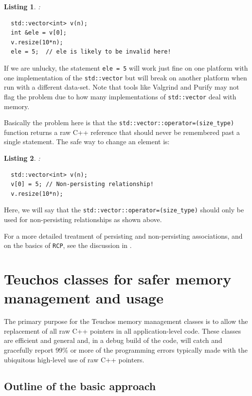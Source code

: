 \documentclass[pdf,ps2pdf,11pt]{SANDreport}
\newtheorem{listing}{Listing}
\begin{document}
\begin{listing}:\\
{\small\begin{verbatim}
  std::vector<int> v(n);
  int &ele = v[0];
  v.resize(10*n);
  ele = 5;  // ele is likely to be invalid here!
\end{verbatim}}
\end{listing}

If we are unlucky, the statement {}\texttt{ele = 5} will work just
fine on one platform with one implementation of the
{}\texttt{std::vector} but will break on another platform when run
with a different data-set.  Note that tools like Valgrind and Purify
may not flag the problem due to how many implementations of
{}\texttt{std::vector} deal with memory.

Basically the problem here is that the
{}\texttt{std::vector::operator=(size\_type)} function returns a raw
C++ reference that should never be remembered past a single statement.
The safe way to change an element is:

\begin{listing}:\\
{\small\begin{verbatim}
  std::vector<int> v(n);
  v[0] = 5; // Non-persisting relationship!
  v.resize(10*n);
\end{verbatim}}
\end{listing}

Here, we will say that the
{}\texttt{std::vector::operator=(size\_type)} should only be used for
non-persisting relationships as shown above.

For a more detailed treatment of persisting and non-persisting
associations, and on the basics of {}\texttt{RCP}, see the discussion
in {}\cite{RefCountPtrBeginnersGuide}.


%
{}\section{Teuchos classes for safer memory management and usage}
\label{sec:teuchos-mem-mng-classes}
%

The primary purpose for the Teuchos memory management classes is to
allow the replacement of all raw C++ pointers in all application-level
code.  These classes are efficient and general and, in a debug build
of the code, will catch and gracefully report 99\% or more of the
programming errors typically made with the ubiquitous high-level use
of raw C++ pointers.


%
{}\subsection{Outline of the basic approach}
{}\label{sec:outline_of_basic_approach}
%
\end{document}
